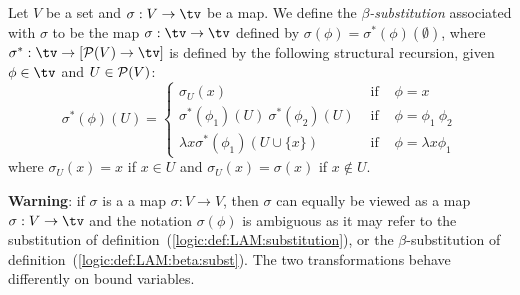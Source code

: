 \begin{defin}\label{logic:def:LAM:beta:subst}
    Let $V$ be  a set and $\sigma :V\to \tv$ be a map. We define the
    {\em $\beta$-substitution} associated with $\sigma$ to be the map 
    $\sigma:\tv\to\tv$ defined by $\sigma(\phi)=\sigma^{*}(\phi)(\emptyset)$, 
    where $\sigma^{*}:\tv\to[{\cal P}(V)\to\tv]$ is defined by the following 
    structural recursion, given $\phi\in\tv$ and $U\in{\cal P}(V)$:
    \begin{equation}\label{logic:eqn:LAM:subst:1}
        \sigma^{*}(\phi)(U)=\left\{
            \begin{array}{lcl}
                \sigma_{U}(x)&\mbox{\ if\ }&\phi=x\\
                \sigma^{*}(\phi_{1})(U)\ \sigma^{*}(\phi_{2})(U)
                    &\mbox{\ if\ }&\phi=\phi_{1}\ \phi_{2}\\
                \lambda x\sigma^{*}(\phi_{1})(U\cup\{x\})&
                    \mbox{\ if\ }&\phi=\lambda x\phi_{1}
            \end{array}\right.
    \end{equation}
    where $\sigma_{U}(x)=x$ if $x\in U$ and $\sigma_{U}(x)=\sigma(x)$ 
    if $x\not\in U$.
\end{defin}
{\bf Warning}: if $\sigma$ is a a map $\sigma:V\to V$, then $\sigma$ can 
equally be viewed as a map $\sigma:V\to\tv$ and the notation $\sigma(\phi)$ 
is ambiguous as it may refer to the substitution of 
definition~(\ref{logic:def:LAM:substitution}), or the $\beta$-substitution
of definition~(\ref{logic:def:LAM:beta:subst}). The two transformations
behave differently on bound variables. 

